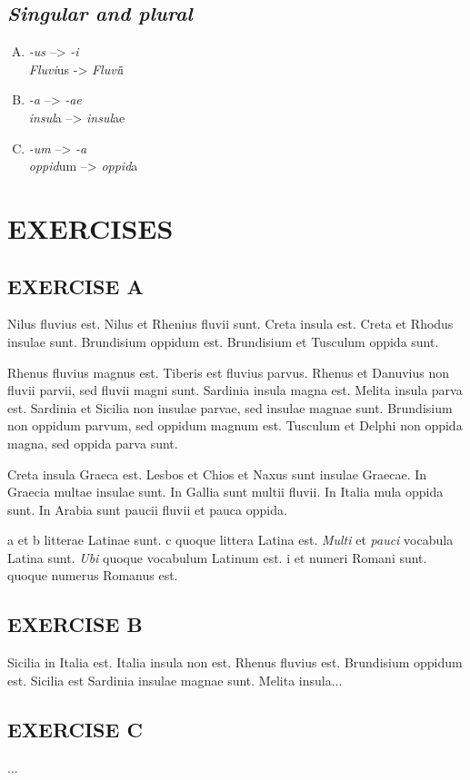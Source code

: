 \subsection{\emph{Singular and plural}}

\begin{enumerate}[(A)]
\item \emph{-us} --> \emph{-i}\\
  \emph{Fluvi}us -> \emph{Fluvi}i
\item \emph{-a} --> \emph{-ae}\\
  \emph{insul}a --> \emph{insul}ae
\item \emph{-um} --> \emph{-a}\\
  \emph{oppid}um --> \emph{oppid}a
\end{enumerate}

\nolinenumbers

\section[Exercises]{EXERCISES}
\subsection*{EXERCISE A}
Nilus fluvius est. Nilus et Rhenius fluvii sunt. Creta insula est. Creta et Rhodus insulae sunt. Brundisium oppidum est. Brundisium et Tusculum oppida sunt.

Rhenus fluvius magnus est. Tiberis est fluvius parvus. Rhenus et Danuvius non fluvii parvii, sed fluvii magni sunt. Sardinia insula magna est. Melita insula parva est. Sardinia et Sicilia non insulae parvae, sed insulae magnae sunt. Brundisium non oppidum parvum, sed oppidum magnum est. Tusculum et Delphi non oppida magna, sed oppida parva sunt.

Creta insula Graeca est. Lesbos et Chios et Naxus sunt insulae Graecae. In Graecia multae insulae sunt. In Gallia sunt multii fluvii. In Italia mula oppida sunt. In Arabia sunt paucii fluvii et pauca oppida.

\smallc a et \smallc b litterae Latinae sunt. \smallc c quoque littera Latina est. \emph{Multi} et \emph{pauci} vocabula Latina sunt. \emph{Ubi} quoque vocabulum Latinum est. \smallc i et  numeri Romani sunt.  quoque numerus Romanus est.

\subsection*{EXERCISE B}
Sicilia in Italia est. Italia insula non est. Rhenus fluvius est. Brundisium oppidum est. Sicilia est Sardinia insulae magnae sunt. Melita insula...

\subsection*{EXERCISE C}
...
